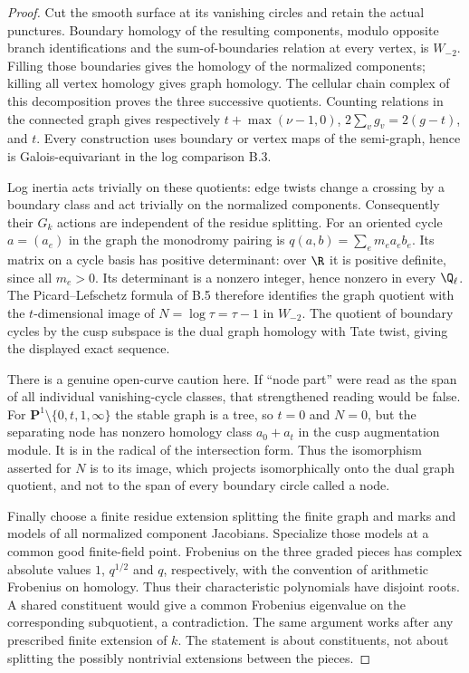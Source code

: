 \begin{proof}
Cut the smooth surface at its vanishing circles and retain the actual
punctures. Boundary homology of the resulting components, modulo opposite
branch identifications and the sum-of-boundaries relation at every vertex,
is $W_{-2}$. Filling those boundaries gives the homology of the normalized
components; killing all vertex homology gives graph homology. The cellular
chain complex of this decomposition proves the three successive quotients.
Counting relations in the connected graph gives respectively
$t+\max(\nu-1,0)$, $2\sum_vg_v=2(g-t)$, and $t$.
Every construction uses boundary or vertex maps of the semi-graph, hence
is Galois-equivariant in the log comparison B.3.

Log inertia acts trivially on these quotients: edge twists change a
crossing by a boundary class and act trivially on the normalized components.
Consequently their $G_k$ actions are independent of the residue splitting.
For an oriented cycle $a=(a_e)$ in the graph the monodromy pairing is
$q(a,b)=\sum_em_ea_eb_e$. Its matrix on a cycle basis has positive
determinant: over $\R$ it is positive definite, since all $m_e>0$.
Its determinant is a nonzero integer, hence nonzero in every $\Q_\ell$.
The Picard--Lefschetz formula of B.5 therefore identifies the graph quotient
with the $t$-dimensional image of $N=\log\tau=\tau-1$ in $W_{-2}$.
The quotient of boundary cycles by the cusp subspace is the dual graph
homology with Tate twist, giving the displayed exact sequence.

There is a genuine open-curve caution here. If ``node part'' were read as
the span of all individual vanishing-cycle classes, that strengthened
reading would be false. For $\mathbf P^1\setminus\{0,t,1,\infty\}$ the
stable graph is a tree, so $t=0$ and $N=0$, but the separating node has
nonzero homology class $a_0+a_t$ in the cusp augmentation module. It is in
the radical of the intersection form. Thus the isomorphism asserted for
$N$ is to its image, which projects isomorphically onto the dual graph
quotient, and not to the span of every boundary circle called a node.

Finally choose a finite residue extension splitting the finite graph and
marks and models of all normalized component Jacobians. Specialize those
models at a common good finite-field point. Frobenius on the three graded
pieces has complex absolute values $1$, $q^{1/2}$ and $q$, respectively,
with the convention of arithmetic Frobenius on homology. Thus their
characteristic polynomials have disjoint roots. A shared constituent would
give a common Frobenius eigenvalue on the corresponding subquotient, a
contradiction. The same argument works after any prescribed finite
extension of $k$. The statement is about constituents, not about splitting
the possibly nontrivial extensions between the pieces.
\end{proof}

